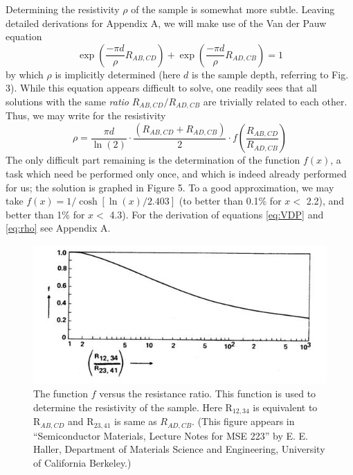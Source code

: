 \documentclass{../lab}
\begin{document}
Determining the resistivity $\rho$ of the sample is somewhat more subtle. Leaving detailed derivations for Appendix A, we will make use of the Van der Pauw equation
\begin{equation}\label{eq:VDP}
    \exp\left(\frac{-\pi d }{\rho}R_{AB,CD}\right)
    + \exp\left(\frac{-\pi d}{\rho}R_{AD,CB}\right) = 1
\end{equation}
by which $\rho$ is implicitly determined (here $d$ is the sample depth, referring to Fig. 3). While this equation appears difficult to solve, one readily sees that all solutions with the same \emph{ratio} $R_{AB,CD} / R_{AD,CB}$ are trivially related to each other. Thus, we may write for the resistivity
\begin{equation}\label{eq:rho}
    \rho = \frac{\pi d}{\ln(2)} \cdot \frac{(R_{AB,CD}+R_{AD,CB})}{2}\cdot f\left(\frac{R_{AB,CD}}{R_{AD,CB}}\right)
\end{equation}
The only difficult part remaining is the determination of the function $f(x)$, a task which need be performed only once, and which is indeed already performed for us; the solution is graphed in Figure 5. To a good approximation, we may take $f(x) = 1/\cosh[\ln(x)/2.403]$ (to better than 0.1\% for $x <$ 2.2), and better than 1\% for $x <$ 4.3). For the derivation of equations \ref{eq:VDP} and \ref{eq:rho} see Appendix A.

\begin{figure}[h]
    \centering
    \includegraphics[width=0.7\linewidth]{images/FvsResistanceRatio.jpg}
    \caption{The function $f$ versus the resistance ratio. This function is used to determine the resistivity of the sample. Here R$_{12,34}$ is equivalent to R$_{AB,CD}$ and R$_{23,41}$ is same as $R_{AD,CB}$. (This figure appears in ``Semiconductor Materials, Lecture Notes for MSE 223'' by E. E. Haller, Department of Materials Science and Engineering, University of California Berkeley.)}
\end{figure}
\end{document}
